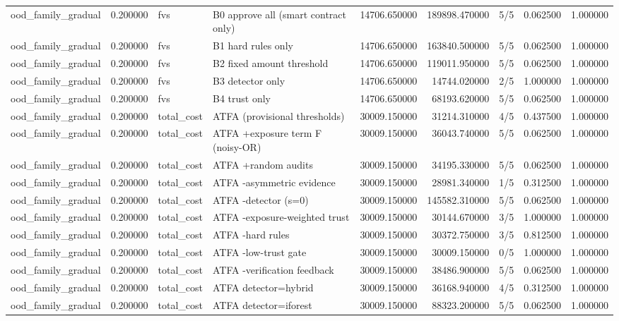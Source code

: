 \begin{tabular}{lrllrrlrr}
ood\_family\_gradual & 0.200000 & fvs & B0 approve all (smart contract only) & 14706.650000 & 189898.470000 & 5/5 & 0.062500 & 1.000000 \\
ood\_family\_gradual & 0.200000 & fvs & B1 hard rules only & 14706.650000 & 163840.500000 & 5/5 & 0.062500 & 1.000000 \\
ood\_family\_gradual & 0.200000 & fvs & B2 fixed amount threshold & 14706.650000 & 119011.950000 & 5/5 & 0.062500 & 1.000000 \\
ood\_family\_gradual & 0.200000 & fvs & B3 detector only & 14706.650000 & 14744.020000 & 2/5 & 1.000000 & 1.000000 \\
ood\_family\_gradual & 0.200000 & fvs & B4 trust only & 14706.650000 & 68193.620000 & 5/5 & 0.062500 & 1.000000 \\
ood\_family\_gradual & 0.200000 & total\_cost & ATFA (provisional thresholds) & 30009.150000 & 31214.310000 & 4/5 & 0.437500 & 1.000000 \\
ood\_family\_gradual & 0.200000 & total\_cost & ATFA +exposure term F (noisy-OR) & 30009.150000 & 36043.740000 & 5/5 & 0.062500 & 1.000000 \\
ood\_family\_gradual & 0.200000 & total\_cost & ATFA +random audits & 30009.150000 & 34195.330000 & 5/5 & 0.062500 & 1.000000 \\
ood\_family\_gradual & 0.200000 & total\_cost & ATFA -asymmetric evidence & 30009.150000 & 28981.340000 & 1/5 & 0.312500 & 1.000000 \\
ood\_family\_gradual & 0.200000 & total\_cost & ATFA -detector (s=0) & 30009.150000 & 145582.310000 & 5/5 & 0.062500 & 1.000000 \\
ood\_family\_gradual & 0.200000 & total\_cost & ATFA -exposure-weighted trust & 30009.150000 & 30144.670000 & 3/5 & 1.000000 & 1.000000 \\
ood\_family\_gradual & 0.200000 & total\_cost & ATFA -hard rules & 30009.150000 & 30372.750000 & 3/5 & 0.812500 & 1.000000 \\
ood\_family\_gradual & 0.200000 & total\_cost & ATFA -low-trust gate & 30009.150000 & 30009.150000 & 0/5 & 1.000000 & 1.000000 \\
ood\_family\_gradual & 0.200000 & total\_cost & ATFA -verification feedback & 30009.150000 & 38486.900000 & 5/5 & 0.062500 & 1.000000 \\
ood\_family\_gradual & 0.200000 & total\_cost & ATFA detector=hybrid & 30009.150000 & 36168.940000 & 4/5 & 0.312500 & 1.000000 \\
ood\_family\_gradual & 0.200000 & total\_cost & ATFA detector=iforest & 30009.150000 & 88323.200000 & 5/5 & 0.062500 & 1.000000 \\

\end{tabular}
